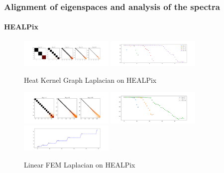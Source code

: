 \subsubsection{Alignment of eigenspaces and analysis of the spectra}

\paragraph{HEALPix}
\begin{figure}[h]
	\label{fig:HeatKernelGraphLaplacianHealpix}
	\centering
	\includegraphics[width=0.4\textwidth]{../codes/02.HeatKernelGraphLaplacian/HEALPix/06_figures/optimal_thresholded.png}
	\includegraphics[width=0.4\textwidth]{../codes/02.HeatKernelGraphLaplacian/HEALPix/06_figures/optimal_thresholded_diagonal.png}	
	\caption{Heat Kernel Graph Laplacian on HEALPix}
\end{figure}

\begin{figure}[h]
	\label{fig:FEMHealpix}
	\caption{Linear FEM Laplacian on HEALPix}
	\centering
	\includegraphics[width=0.4\textwidth]{../codes/03.FEM_laplacian/HEALPix/img/linearFEM.png}
	\includegraphics[width=0.4\textwidth]{../codes/03.FEM_laplacian/HEALPix/img/linearFEM_diagonal.png}	
	\includegraphics[width=0.4\textwidth]{../codes/03.FEM_laplacian/HEALPix/img/FEM_eigenvalues_16.png}	 
\end{figure}

